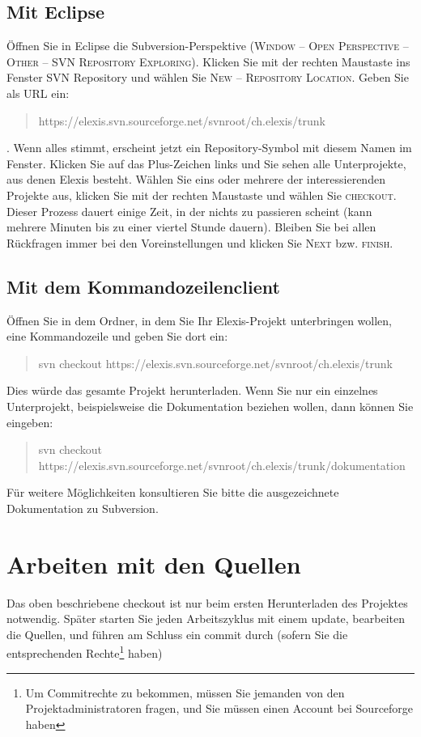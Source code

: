 \subsection{Mit Eclipse}
Öffnen Sie in Eclipse die Subversion-Perspektive (\textsc{Window -- Open
Perspective -- Other -- SVN Repository Exploring}). Klicken Sie mit der rechten
Maustaste ins Fenster \glqq SVN Repository\grqq{} und wählen Sie \textsc{New --
Repository Location}. Geben Sie als URL ein:
\begin{quote}https://elexis.svn.sourceforge.net/svnroot/ch.elexis/trunk\end{quote}. Wenn alles stimmt, erscheint
jetzt ein Repository-Symbol mit diesem Namen im Fenster. Klicken Sie auf das
Plus-Zeichen links und Sie sehen alle Unterprojekte, aus denen Elexis besteht.
Wählen Sie eins oder mehrere der interessierenden Projekte aus, klicken Sie mit
der rechten Maustaste und wählen Sie \textsc{checkout}. Dieser Prozess dauert
einige Zeit, in der \glqq nichts\grqq{} zu passieren scheint (kann mehrere Minuten
bis zu einer viertel Stunde dauern). Bleiben Sie bei allen Rückfragen immer
bei den Voreinstellungen und klicken Sie \textsc{Next} bzw. \textsc{finish}.
\subsection{Mit dem Kommandozeilenclient}
Öffnen Sie in dem Ordner, in dem Sie Ihr Elexis-Projekt unterbringen wollen,
eine Kommandozeile und geben Sie dort ein: \begin{quote}svn checkout
https://elexis.svn.sourceforge.net/svnroot/ch.elexis/trunk\end{quote} Dies würde das gesamte Projekt
herunterladen. Wenn Sie nur ein einzelnes Unterprojekt, beispielsweise die
Dokumentation beziehen wollen, dann können Sie eingeben: \begin{quote}svn checkout
https://elexis.svn.sourceforge.net/svnroot/ch.elexis/trunk/dokumentation\end{quote} Für weitere
Möglichkeiten konsultieren Sie bitte die ausgezeichnete Dokumentation zu
Subversion.

\section{Arbeiten mit den Quellen}
Das oben beschriebene \glqq checkout\grqq{} ist nur beim ersten Herunterladen des
Projektes notwendig. Später starten Sie jeden Arbeitszyklus mit einem \glqq
update\grqq, bearbeiten die Quellen, und führen am Schluss ein \glqq commit\grqq{}
durch (sofern Sie die entsprechenden Rechte\footnote{Um Commitrechte zu
bekommen, müssen Sie jemanden von den Projektadministratoren fragen, und Sie
müssen einen Account bei Sourceforge haben} haben)
